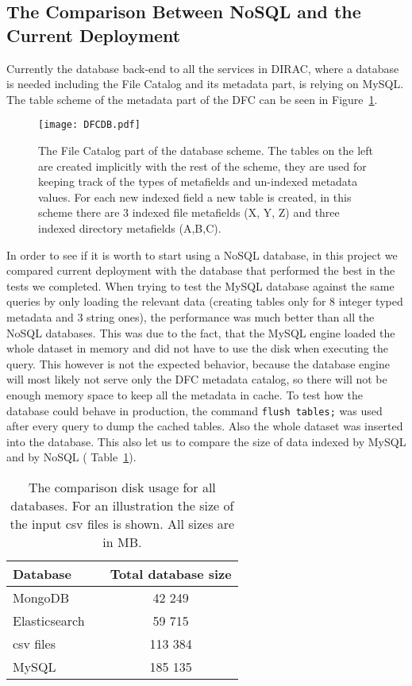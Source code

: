 \subsection{The Comparison Between NoSQL and the Current Deployment}

Currently the database back-end to all the services in DIRAC, where a database is needed including the File 
Catalog and its metadata part, is relying on MySQL. The table scheme of the metadata part of the DFC can be seen 
in Figure~\ref{fig:DFCUML}.

\begin{figure}[h]
	\centering
	\texttt{[image: DFCDB.pdf]}
	\caption{The File Catalog part of the database scheme. The tables on the left are created implicitly with the
	rest of the scheme, they are used  for keeping track of the types of metafields and un-indexed  metadata 
	values. For each new indexed field a new table is created, in this scheme there are 3 indexed file metafields
	(X, Y, Z) and three indexed directory metafields (A,B,C).}
	\label{fig:DFCUML}
\end{figure}

In order to see if it is worth to start using a NoSQL database, in this project we compared current deployment  
with the database that performed the
best in the tests we completed. When trying to test the MySQL database against the same queries 
by only loading the relevant data (creating tables only for 8 integer typed metadata and 3 string ones), the 
performance was much better than all the NoSQL databases. This was due to the fact, that the MySQL engine loaded
the whole dataset in memory and did not have to use the disk when executing the query. This however is not the expected 
behavior, because the database engine will most likely not serve only the DFC metadata catalog, so there will not
be enough memory space to keep all the metadata in cache. To test how the database could behave in production, the 
command \texttt{flush tables;} was used after every query to dump the cached tables. Also the whole dataset
was inserted into the database. This also let us to compare the size of data indexed by MySQL and by NoSQL (
Table~\ref{tab:allDbSizes}). 

\begin{table}[h]
\centering
\label{tab:allDbSizes}
\begin{tabular}{lcc}
\toprule
\textbf{Database}      & & \textbf{Total database size}  \\ 
\midrule
MongoDB                & & 42 249                        \\ 
Elasticsearch          & & 59 715                        \\ 
csv files              & & 113 384                       \\ 
MySQL                  & & 185 135                       \\ 
\toprule
\end{tabular}
\caption{The comparison disk usage for all databases. For an illustration the size of the input csv files is
shown. All sizes are in MB.}
\end{table}

